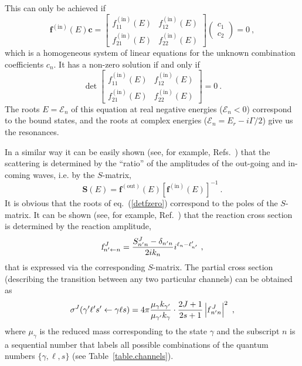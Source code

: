 \documentclass[12pt]{article}
\begin{document}
This can only be achieved if
\begin{equation}
\label{fczero}
  \bm{f}^{\mathrm{(in)}}(E)\bm{c}=
  \begin{bmatrix}
  f_{11}^{\mathrm{(in)}}(E) & f_{12}^{\mathrm{(in)}}(E)\\[3mm]
  f_{21}^{\mathrm{(in)}}(E) & f_{22}^{\mathrm{(in)}}(E)
  \end{bmatrix}
  \begin{pmatrix} c_1 \\ c_2 \end{pmatrix}=0\ ,
\end{equation}
which is a homogeneous system of linear equations for the unknown combination
coefficients $c_n$. It has a non-zero solution if and only if
\begin{equation}
\label{detfzero}
  \det
  \begin{bmatrix}
  f_{11}^{\mathrm{(in)}}(E) & f_{12}^{\mathrm{(in)}}(E)\\[3mm]
  f_{21}^{\mathrm{(in)}}(E) & f_{22}^{\mathrm{(in)}}(E)
  \end{bmatrix}
  =0\ .
\end{equation}
The roots $E=\mathcal{E}_n$ of this equation at real negative energies
($\mathcal{E}_n<0$)
correspond to the bound states, and the roots at complex energies
($\mathcal{E}_n=E_r-i\Gamma/2$) give us the resonances.

In a similar way it can be easily shown (see, for example,
Refs.~\cite{our.MultiCh,two_channel}) that the scattering is determined by the
``ratio'' of the amplitudes of the out-going and in-coming waves, i.e. by the
$S$-matrix,
\begin{equation}
\label{Smatrix}
   \bm{S}(E)=\bm{f}^{\mathrm{(out)}}(E)
   \left[\bm{f}^{\mathrm{(in)}}(E)\right]^{-1}\ .
\end{equation}
It is obvious that the roots of eq.~(\ref{detfzero}) correspond to the poles of
the $S$-matrix.
It can be shown (see, for example, Ref.~\cite{Frobrich}) that the
reaction cross section is determined by the reaction amplitude,
\begin{equation}
\label{multichannel.partial.Amplitude}
   \mbox{\sl f}^{\,J}_{n'\gets n}=
   \frac{S^J_{n'n}-\delta_{n'n}}{2ik_n}i^{\ell_n-\ell'_{n'}}\ ,
\end{equation}
that is expressed via the corresponding $S$-matrix.
The partial cross section (describing the transition between any two particular
channels) can be obtained as
\begin{equation}
\label{particular_sigma}
   \sigma^J(\gamma'\ell's'\gets\gamma\ell s)=4\pi
   \frac{\mu_\gamma k_{\gamma'}}{\mu_{\gamma'}k_\gamma}\cdot
   \frac{2J+1}{2s+1}\left|\mbox{\sl f}^{\,\,J}_{\,n'n}\right|^2\ ,
\end{equation}
where $\mu_\gamma$ is the reduced mass corresponding to the state $\gamma$
and the subscript $n$ is a sequential number that labels all possible
combinations of the quantum numbers $\{\gamma,\ell,s\}$ (see
Table~\ref{table.channels}).
\end{document}
